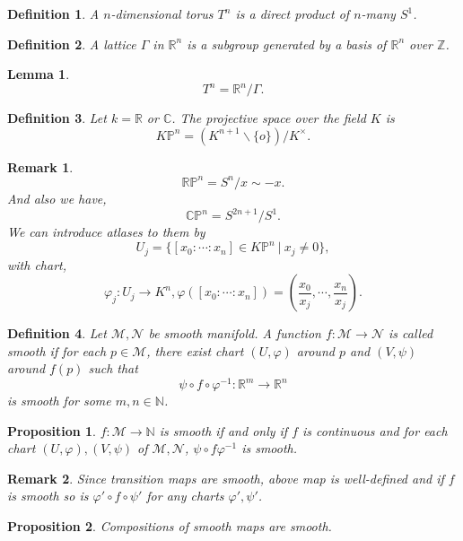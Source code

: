 \documentclass[10pt]{article}
\newtheorem{proposition}{Proposition}[section]
\newtheorem{definition}{Definition}[section]
\newtheorem{lemma}{Lemma}[section]
\newtheorem{remark}{Remark}[section]
\newcommand{\N}[0]{\mathbb{N}}
\newcommand{\R}[0]{\mathbb{R}}
\newcommand{\Z}[0]{\mathbb{Z}}
\newcommand{\C}[0]{\mathbb{C}}
\newcommand{\Para}[0]{\mathbb{P}}
\newcommand{\M}[0]{\mathcal{M}}
\newcommand{\maniN}[0]{\mathcal{N}}
\newcommand{\sep}[0]{\:|\:}
\begin{document}
\begin{definition}
  A $n$-dimensional torus $T^n$ is a direct product of $n$-many $S^1$. 
\end{definition}

\begin{definition}
  A lattice $\Gamma$ in $\R^n$ is a subgroup generated by a basis of $\R^n$ over $\Z$. 
\end{definition}

\begin{lemma}
\begin{equation*}
  T^n = \R^n/\Gamma. 
\end{equation*}
\end{lemma}

\begin{definition}
  Let $k=\R$ or $\C$. The projective space over the field $K$ is 
  \begin{equation*}
    K\Para^n=(K^{n+1}\backslash\{o\})/K^\times.
  \end{equation*}
\end{definition}
\begin{remark}
  \begin{equation*}
    \R\Para^n = S^n/x\sim-x.
  \end{equation*}
  And also we have,
  \begin{equation*}
    \C\Para^n = S^{2n+1}/S^1.
  \end{equation*}
  We can introduce atlases to them by 
  \begin{equation*}
    U_j = \{[x_0:\cdots:x_n]\in K\Para^n\sep x_j\not=0\},
  \end{equation*}
  with chart,
  \begin{equation*}
    \varphi_j:U_j\to K^n, \varphi([x_0:\cdots:x_n]) = \left({\frac {x_0} {x_j}},\cdots,{\frac {x_n} {x_j}}\right).
  \end{equation*}
\end{remark}
\begin{definition}
  Let $\mathcal{M},\mathcal{N}$ be smooth manifold. A function $f:\mathcal{M}\to\mathcal{N}$ is called smooth if for each $p\in\mathcal{M}$, there exist chart $(U,\varphi)$ around $p$ and $(V,\psi)$ around $f(p)$ such that 
  \begin{equation*}
    \psi\circ f\circ \varphi^{-1}:\R^m \to \R^n
  \end{equation*}
  is smooth for some $m,n\in\N$. 
\end{definition}

\begin{proposition}
  $f:\M\to\N$ is smooth if and only if $f$ is continuous and for each chart $(U,\varphi),(V,\psi)$ of $\M,\maniN$, $\psi\circ f\varphi^{-1}$ is smooth.
\end{proposition}
\begin{remark}
  Since transition maps are smooth, above map is well-defined and if $f$ is smooth so is $\varphi'\circ f\circ \psi'$ for any charts $\varphi',\psi'$. 
\end{remark}
\begin{proposition}
  Compositions of smooth maps are smooth.
\end{proposition}
\end{document}
